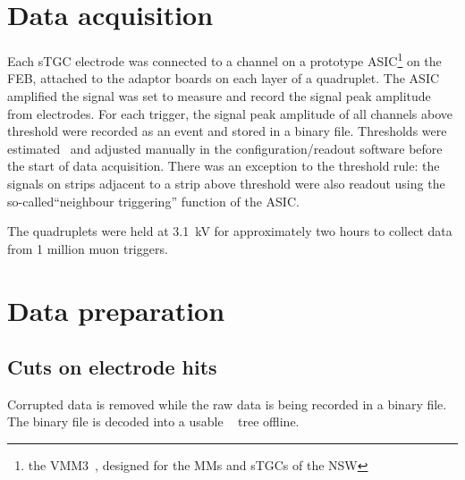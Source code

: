 
\section{Data acquisition}
Each sTGC electrode was connected to a channel on a prototype ASIC\footnote{the VMM3~\cite{iakovidis_vmm3_2017}, designed for the MMs and sTGCs of the NSW} on the FEB, attached to the adaptor boards on each layer of a quadruplet.  The ASIC amplified the signal was set to measure and record the signal peak amplitude from electrodes. For each trigger, the signal peak amplitude of all channels above threshold were recorded as an event and stored in a binary file. Thresholds were estimated~\cite{chen_calibration_2019} and adjusted manually in the configuration/readout software before the start of data acquisition. There was an exception to the threshold rule: the signals on strips adjacent to a strip above threshold were also readout using the so-called``neighbour triggering'' function of the ASIC. 

The quadruplets were held at 3.1~kV for approximately two hours to collect data from 1 million muon triggers.

\section{Data preparation}
\subsection{Cuts on electrode hits}
Corrupted data is removed while the raw data is being recorded in a binary file. The binary file is decoded into a usable ~\cite{ROOT_paper} tree offline. 

